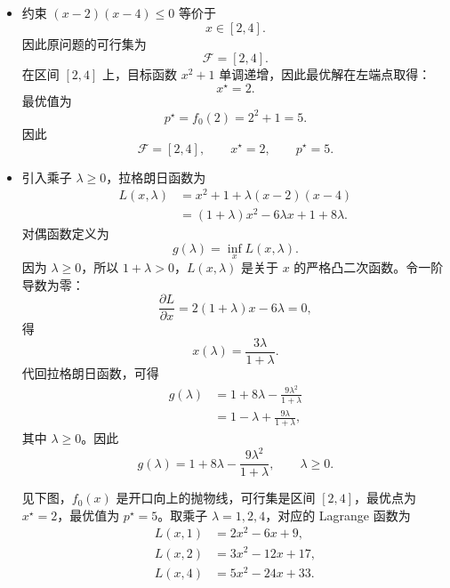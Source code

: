 \documentclass[12pt,a4paper]{article}
\begin{document}
\begin{itemize}
  \item[(a)] 约束 $(x-2)(x-4)\leq 0$ 等价于
  \[
    x\in[2,4].
  \]
  因此原问题的可行集为
  \[
    \mathcal F=[2,4].
  \]
  在区间 $[2,4]$ 上，目标函数 $x^2+1$ 单调递增，因此最优解在左端点取得：
  \[
    x^\star=2.
  \]
  最优值为
  \[
    p^\star=f_0(2)=2^2+1=5.
  \]
  因此
  \[
    \boxed{\mathcal F=[2,4],\qquad x^\star=2,\qquad p^\star=5.}
  \]

  \item[(b)] 引入乘子 $\lambda\geq0$，拉格朗日函数为
  \[
  \begin{aligned}
    L(x,\lambda)
    &=x^2+1+\lambda(x-2)(x-4)\\
    &=(1+\lambda)x^2-6\lambda x+1+8\lambda.
  \end{aligned}
  \]
  对偶函数定义为
  \[
    g(\lambda)=\inf_x L(x,\lambda).
  \]
  因为 $\lambda\geq 0$，所以 $1+\lambda>0$，$L(x,\lambda)$ 是关于 $x$ 的严格凸二次函数。令一阶导数为零：
  \[
    \frac{\partial L}{\partial x}
    =2(1+\lambda)x-6\lambda=0,
  \]
  得
  \[
    x(\lambda)=\frac{3\lambda}{1+\lambda}.
  \]
  代回拉格朗日函数，可得
  \[
  \begin{aligned}
    g(\lambda)
    &=1+8\lambda-\frac{9\lambda^2}{1+\lambda}\\
    &=1-\lambda+\frac{9\lambda}{1+\lambda},
  \end{aligned}
  \]
  其中 $\lambda\geq 0$。因此
  \[
    \boxed{
    g(\lambda)=1+8\lambda-\frac{9\lambda^2}{1+\lambda},
    \qquad \lambda\geq 0.}
  \]

  见下图，$f_0(x)$ 是开口向上的抛物线，可行集是区间 $[2,4]$，最优点为 $x^\star=2$，最优值为 $p^\star=5$。取乘子 $\lambda=1,2,4$，对应的 Lagrange 函数为
  \[
  \begin{aligned}
    L(x,1)&=2x^2-6x+9,\\
    L(x,2)&=3x^2-12x+17,\\
    L(x,4)&=5x^2-24x+33.
  \end{aligned}
  \]
 

  \begin{center}
  \end{center}


\end{itemize}
\end{document}
